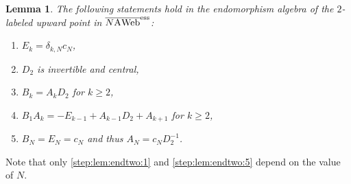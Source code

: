 \documentclass[11pt]{article}
\newtheorem{lemma}[theo]{Lemma}
\theoremstyle{definition}
\numberwithin{equation}{section}
\newcommand{\cat}[1]{\ensuremath{\mbox{\bfseries {\upshape {#1}}}}}
\newcommand{\wrap}{D}
\newcommand{\AWeb}[1][]{#1\cat{A}\cat{Web}}
\newcommand{\essbAWeb}[1][]{\overline{#1\AWeb}^{\mathrm{ess}}}
\begin{document}
\begin{lemma}\label{lem:endtwo} The following statements hold in the endomorphism algebra of the $2$-labeled upward point in $\essbAWeb[N]$:
\begin{enumerate}
\item $E_k = \delta_{k,N} c_N$, \label{step:lem:endtwo:1}
\item $\wrap_2$ is invertible and central, \label{step:lem:endtwo:2}
\item $B_k= A_k \wrap_2$ for $k\geq 2$, \label{step:lem:endtwo:3}
\item $B_1 A_k = - E_{k-1} + A_{k-1} \wrap_2 + A_{k+1}$ for $k\geq 2$, \label{step:lem:endtwo:4}
\item $B_N=E_N=c_N$ and thus $A_{N}=c_N \wrap_2^{-1}$. \label{step:lem:endtwo:5}
\end{enumerate}
\end{lemma}
Note that only \eqref{step:lem:endtwo:1} and \eqref{step:lem:endtwo:5} depend on the value of $N$.
\end{document}
